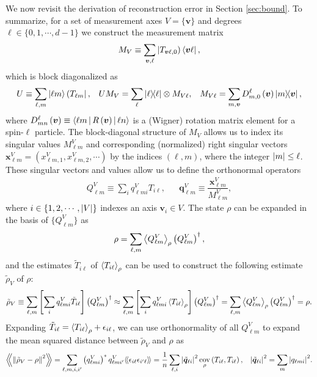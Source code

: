 \documentclass[notitlepage,twocolumn]{revtex4-2}
\newcommand{\f}[2]{\dfrac{#1}{#2}} %
\newcommand{\p}[1]{\left(#1\right)} %
\renewcommand{\sp}[1]{\left[#1\right]} %
\newcommand{\bk}{\Braket} %
\renewcommand{\v}{\bm} %
\renewcommand{\set}[1]{\{#1\}} %
\newcommand{\bbk}[1]{\langle\!\langle #1 \rangle\!\rangle}
\newcommand{\Bbk}[1]
{\left\langle\!\!\left\langle #1 \right\rangle\!\!\right\rangle}
\def\obra#1{\mathinner{({#1}|}}
\def\oket#1{\mathinner{|{#1})}}
\DeclareMathOperator{\cov}{cov}
\begin{document}
We now revisit the derivation of reconstruction error in Section \ref{sec:bound}.
To summarize, for a set of measurement axes $V=\set{\v v}$ and degrees $\ell\in\set{0,1,\cdots,d-1}$ we construct the measurement matrix
\begin{align}
  M_V \equiv \sum_{\v v,\ell} \oket{T_{\v v\ell,0}} \bra{\v v\ell},
\end{align}
which is block diagonalized as
\begin{align}
  U \equiv \sum_{\ell,m} \ket{\ell m} \obra{T_{\ell m}},
  &&
  U M_V = \sum_\ell \op{\ell} \otimes M_{V\ell},
  &&
  M_{V\ell} = \sum_{m,\v v} D^\ell_{m,0}\p{\v v} \op{m}{\v v},
\end{align}
where $D^\ell_{mn}\p{\v v}\equiv\bk{\ell m|R\p{\v v}|\ell n}$ is a (Wigner) rotation matrix element for a spin-$\ell$ particle.
The block-diagonal structure of $M_V$ allows us to index its singular values $M^V_{\ell m}$ and corresponding (normalized) right singular vectors $\v x^V_{\ell m} = (x^V_{\ell m,1}, x^V_{\ell m,2}, \cdots )$ by the indices $\p{\ell,m}$, where the integer $\abs{m}\le\ell$.
These singular vectors and values allow us to define the orthonormal operators
\begin{align}
  Q^V_{\ell m} \equiv \sum_i q^V_{\ell mi} T_{i\ell},
  &&
  \v q^V_{\ell m} \equiv \f{\v x^V_{\ell m}}{M^V_{\ell m}},
\end{align}
where $i\in\set{1,2,\cdots,\abs{V}}$ indexes an axis $\v v_i\in V$.
The state $\rho$ can be expanded in the basis of $\set{Q^V_{\ell m}}$ as
\begin{align}
  \rho = \sum_{\ell,m} \bk{Q^V_{\ell m}}_\rho \p{Q^V_{\ell m}}^\dag,
\end{align}
and the estimates $\tilde T_{i\ell}$ of $\bk{T_{i\ell}}_\rho$ can be used to construct the following estimate $\tilde\rho_V$ of $\rho$:
\begin{align}
  \tilde\rho_V
  \equiv \sum_{\ell,m} \sp{\sum_i q^V_{\ell mi} \tilde T_{i\ell}}
  \p{Q^V_{\ell m}}^\dag
  \approx \sum_{\ell,m} \sp{\sum_i q^V_{\ell mi} \bk{T_{i\ell}}_\rho}
  \p{Q^V_{\ell m}}^\dag
  = \sum_{\ell,m} \bk{Q^V_{\ell m}}_\rho \p{Q^V_{\ell m}}^\dag
  = \rho.
\end{align}
Expanding $\tilde T_{i\ell} = \bk{T_{i\ell}}_\rho + \epsilon_{i\ell}$, we can use orthonormality of all $Q^V_{\ell m}$ to expand the mean squared distance between $\tilde\rho_V$ and $\rho$ as
\begin{align}
  \Bbk{\norm{\tilde\rho_V-\rho}^2}
  = \sum_{\ell,m,i,i'} \p{q^V_{\ell mi}}^* q^V_{\ell mi'} \bbk{\epsilon_{i\ell} \epsilon_{i'\ell}}
  = \f1n \sum_{\ell,i} \abs{\tilde{\v q}_{\ell i}}^2 \cov_\rho\p{T_{i\ell},T_{i\ell}},
  &&
  \abs{\tilde{\v q}_{\ell i}}^2 = \sum_m \abs{q_{\ell mi}}^2.
  \label{eq:error_SM_start}
\end{align}
\end{document}
